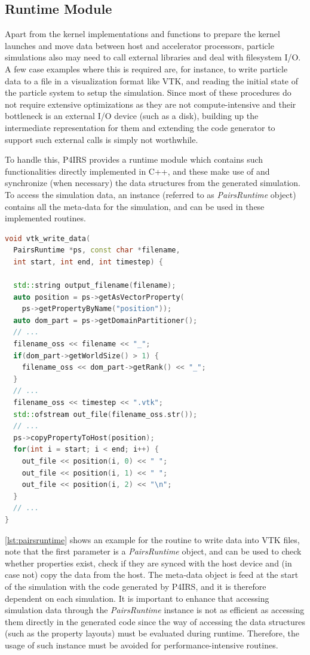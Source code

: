 \documentclass[Afour,sageh,times]{sagej}
\begin{document}
\subsection{Runtime Module}

Apart from the kernel implementations and functions to prepare the kernel launches and move data between host and accelerator processors, particle simulations also may need to call external libraries and deal with filesystem I/O.
A few case examples where this is required are, for instance, to write particle data to a file in a visualization format like VTK, and reading the initial state of the particle system to setup the simulation.
Since most of these procedures do not require extensive optimizations as they are not compute-intensive and their bottleneck is an external I/O device (such as a disk), building up the intermediate representation for them and extending the code generator to support such external calls is simply not worthwhile.

To handle this, P4IRS provides a runtime module which contains such functionalities directly implemented in C++, and these make use of and synchronize (when necessary) the data structures from the generated simulation.
To access the simulation data, an instance (referred to as \emph{PairsRuntime} object) contains all the meta-data for the simulation, and can be used in these implemented routines.

\begin{lstlisting}[language=C++,
		   label={lst:pairsruntime},
	   	   caption={P4IRS runtime routine example for writing VTK data into a file.}]
void vtk_write_data(
  PairsRuntime *ps, const char *filename,
  int start, int end, int timestep) {

  std::string output_filename(filename);
  auto position = ps->getAsVectorProperty(
    ps->getPropertyByName("position"));
  auto dom_part = ps->getDomainPartitioner();
  // ...
  filename_oss << filename << "_";
  if(dom_part->getWorldSize() > 1) {
    filename_oss << dom_part->getRank() << "_";
  }
  // ...
  filename_oss << timestep << ".vtk";
  std::ofstream out_file(filename_oss.str());
  // ...
  ps->copyPropertyToHost(position);
  for(int i = start; i < end; i++) {
    out_file << position(i, 0) << " ";
    out_file << position(i, 1) << " ";
    out_file << position(i, 2) << "\n";
  }
  // ...
}
\end{lstlisting}

\autoref{lst:pairsruntime} shows an example for the routine to write data into VTK files, note that the first parameter is a \emph{PairsRuntime} object, and can be used to check whether properties exist, check if they are synced with the host device and (in case not) copy the data from the host.
The meta-data object is feed at the start of the simulation with the code generated by P4IRS, and it is therefore dependent on each simulation.
It is important to enhance that accessing simulation data through the \emph{PairsRuntime} instance is not as efficient as accessing them directly in the generated code since the way of accessing the data structures (such as the property layouts) must be evaluated during runtime.
Therefore, the usage of such instance must be avoided for performance-intensive routines.
\end{document}
